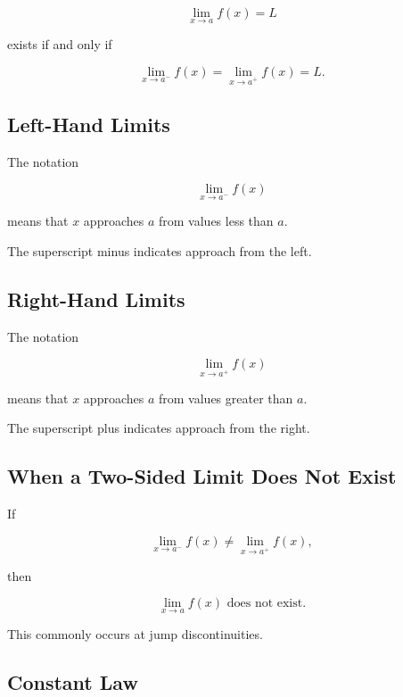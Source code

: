 \[
\boxed{
\lim_{x\to a}f(x)=L
}
\]

exists if and only if

\[
\boxed{
\lim_{x\to a^-}f(x)
=
\lim_{x\to a^+}f(x)
=
L.
}
\]

\subsection{Left-Hand Limits}
\label{subsec:left-hand-limit-reference}

The notation

\[
\boxed{
\lim_{x\to a^-}f(x)
}
\]

means that \(x\) approaches \(a\) from values less than \(a\).

The superscript minus indicates approach from the left.

\subsection{Right-Hand Limits}
\label{subsec:right-hand-limit-reference}

The notation

\[
\boxed{
\lim_{x\to a^+}f(x)
}
\]

means that \(x\) approaches \(a\) from values greater than \(a\).

The superscript plus indicates approach from the right.

\subsection{When a Two-Sided Limit Does Not Exist}
\label{subsec:two-sided-limit-dne}

If

\[
\lim_{x\to a^-}f(x)
\neq
\lim_{x\to a^+}f(x),
\]

then

\[
\boxed{
\lim_{x\to a}f(x)
\text{ does not exist}.
}
\]

This commonly occurs at jump discontinuities.

\subsection{Constant Law}
\label{subsec:constant-limit-law}

